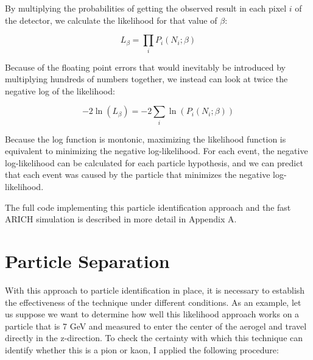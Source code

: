By multiplying the probabilities of getting the observed result in each pixel $i$ of the detector, we calculate the likelihood for that value of $\beta$:

\begin{equation}
L_\beta = \prod_{i}P_i(N_i; \beta)
\end{equation}

Because of the floating point errors that would inevitably be introduced by multiplying hundreds of numbers together, we instead can look at twice the negative log of the likelihood:

\begin{equation}
    \label{eq:log-likelihood}
    -2\ln(L_\beta) = -2\sum_i \ln(P_i(N_i; \beta))
\end{equation}

Because the log function is montonic, maximizing the likelihood function is equivalent to minimizing the negative log-likelihood.
For each event, the negative log-likelihood can be calculated for each particle hypothesis, and we can predict that each event was caused by the particle that minimizes the negative log-likelihood.

The full code implementing this particle identification approach and the fast ARICH simulation is described in more detail in Appendix A.

\section{Particle Separation}
With this approach to particle identification in place, it is necessary to establish the effectiveness of the technique under different conditions.
As an example, let us suppose we want to determine how well this likelihood approach works on a particle that is 7 GeV and measured to enter the center of the aerogel and travel directly in the z-direction.
To check the certainty with which this technique can identify whether this is a pion or kaon, I applied the following procedure:

